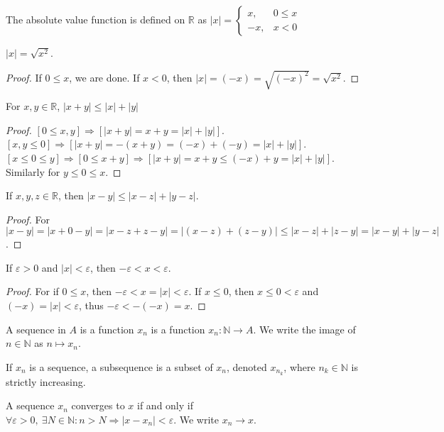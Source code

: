 \documentclass[crop=false,class=book]{standalone}
\begin{document}
\begin{definition}
The absolute value function is defined on $\mathbb{R}$ as $|x| = \begin{cases} x, & 0 \leq x \\ -x, & x<0 \end{cases}$
\end{definition}
\begin{theorem}
$|x| = \sqrt{x^2}$.
\end{theorem}
\begin{proof}
If $0 \leq x$, we are done. If $x<0$, then $|x| = (-x) = \sqrt{(-x)^2} = \sqrt{x^2}$.
\end{proof}
\begin{theorem}
For $x,y \in \mathbb{R}$, $|x+y|\leq |x|+|y|$
\end{theorem}
\begin{proof}
$[0\leq x,y]\Rightarrow [|x+y| = x+y = |x|+|y|]$. $[x,y\leq 0]\Rightarrow [|x+y| = -(x+y) = (-x)+(-y)=|x|+|y|]$. $[x\leq 0 \leq y]\Rightarrow [0\leq x+y]\Rightarrow [|x+y| = x+y \leq (-x)+y=|x|+|y|]$. Similarly for $y\leq 0 \leq x$.
\end{proof}
\begin{corollary}
If $x,y,z\in \mathbb{R}$, then $|x-y| \leq |x-z|+|y-z|$.
\end{corollary}
\begin{proof}
For $|x-y| = |x+ 0 - y| = |x-z+z-y| = |(x-z)+(z-y)| \leq |x-z|+|z-y| = |x-y|+|y-z|$.
\end{proof}
\begin{corollary}
If $\varepsilon >0$ and $|x|<\varepsilon$, then $-\varepsilon < x < \varepsilon$.
\end{corollary}
\begin{proof}
For if $0\leq x$, then $-\varepsilon< x=|x|< \varepsilon$. If $x\leq 0$, then $x\leq 0<\varepsilon$ and $(-x)=|x|<\varepsilon$, thus $-\varepsilon < -(-x) = x$.
\end{proof}
\begin{definition}
A sequence in $A$ is a function $x_n$ is a function $x_n:\mathbb{N}\rightarrow A$. We write the image of $n\in \mathbb{N}$ as $n\mapsto x_n$.
\end{definition}
\begin{definition}
If $x_n$ is a sequence, a subsequence is a subset of $x_n$, denoted $x_{n_k}$, where $n_k\in \mathbb{N}$ is strictly increasing.
\end{definition}
\begin{definition}
A sequence $x_n$ converges to $x$ if and only if $\forall \varepsilon>0,\ \exists N\in \mathbb{N}: n>N\Rightarrow |x-x_n|<\varepsilon$. We write $x_n \rightarrow x$.
\end{definition}
\end{document}
